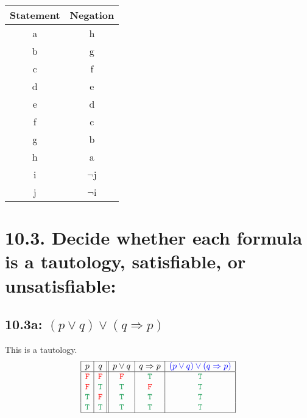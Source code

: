 \documentclass{article}
\begin{document}
\begin{center}\begin{tabular}{|c|c|}
    \hline
    Statement&Negation\\
    \hline
    a&h\\
    b&g\\
    c&f\\
    d&e\\
    e&d\\
    f&c\\
    g&b\\
    h&a\\
    i&$\neg$j\\ %
    j&$\neg$i\\
    \hline
\end{tabular}\end{center}
\section*{10.3. Decide whether each formula is a tautology, satisfiable, or unsatisfiable:}
\subsection*{10.3a: $(p\lor q)\lor(q\Rightarrow p)$}
This is a tautology.
\[\begin{array}{|c|c||c|c|c|}
\hline
p&q&p\lor q&q\Rightarrow p&\textcolor{blue}{(p\lor q)\lor(q\Rightarrow p)}\\
\hline
\textcolor{red}{\tt{F}}&\textcolor{red}{\tt{F}}&\textcolor{red}{\tt{F}}&\textcolor{ForestGreen}{\tt{T}}&\textcolor{ForestGreen}{\tt{T}}\\
\textcolor{red}{\tt{F}}&\textcolor{ForestGreen}{\tt{T}}&\textcolor{ForestGreen}{\tt{T}}&\textcolor{red}{\tt{F}}&\textcolor{ForestGreen}{\tt{T}}\\
\textcolor{ForestGreen}{\tt{T}}&\textcolor{red}{\tt{F}}&\textcolor{ForestGreen}{\tt{T}}&\textcolor{ForestGreen}{\tt{T}}&\textcolor{ForestGreen}{\tt{T}}\\
\textcolor{ForestGreen}{\tt{T}}&\textcolor{ForestGreen}{\tt{T}}&\textcolor{ForestGreen}{\tt{T}}&\textcolor{ForestGreen}{\tt{T}}&\textcolor{ForestGreen}{\tt{T}}\\
\hline
\end{array}\]
\end{document}
